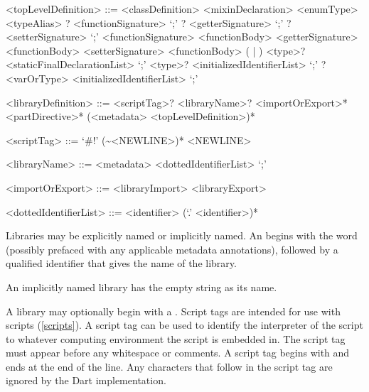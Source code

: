 \documentclass[makeidx]{article}
\begin{document}
{\begin{grammar}
<topLevelDefinition> ::= <classDefinition>
  \alt <mixinDeclaration>
  \alt <enumType>
  \alt <typeAlias>
  \alt \EXTERNAL{}? <functionSignature> `;'
  \alt \EXTERNAL{}? <getterSignature> `;'
  \alt \EXTERNAL{}? <setterSignature> `;'
  \alt <functionSignature> <functionBody>
  \alt <getterSignature> <functionBody>
  \alt <setterSignature> <functionBody>
  \alt (\FINAL{} | \CONST{}) <type>? <staticFinalDeclarationList> `;'
  \alt \LATE{} \FINAL{} <type>? <initializedIdentifierList> `;'
  \alt \LATE{}? <varOrType> <initializedIdentifierList> `;'

<libraryDefinition> ::= \gnewline{}
  <scriptTag>? <libraryName>? <importOrExport>* <partDirective>*
  \gnewline{} (<metadata> <topLevelDefinition>)*

<scriptTag> ::= `#!' (\~{}<NEWLINE>)* <NEWLINE>

<libraryName> ::= <metadata> \LIBRARY{} <dottedIdentifierList> `;'

<importOrExport> ::= <libraryImport>
  \alt <libraryExport>

<dottedIdentifierList> ::= <identifier> (`.' <identifier>)*
\end{grammar}

\LMHash{}%
Libraries may be explicitly named or implicitly named.
An  begins with the word \LIBRARY{} (possibly prefaced with any applicable metadata annotations), followed by a qualified identifier that gives the name of the library.


\LMHash{}%
An implicitly named library has the empty string as its name.



\LMHash{}%
A library may optionally begin with a .
Script tags are intended for use with scripts (\ref{scripts}).
A script tag can be used to identify the interpreter of the script to whatever computing environment the script is embedded in.
The script tag must appear before any whitespace or comments.
A script tag begins with \lit{\#!} and ends at the end of the line.
Any characters that follow \lit{\#!} in the script tag are ignored by
the Dart implementation.

}
\end{document}
